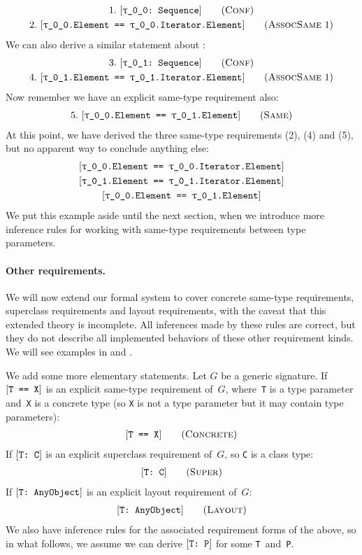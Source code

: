 \documentclass[../generics]{subfiles}
\begin{document}
\begin{example}
\begin{gather*}
\ConfStep{\rT}{Sequence}{1}\\
\AssocSameStep{1}{\rT.Element}{\rT.Iterator.Element}{2}
\end{gather*}
We can also derive a similar statement about \rU:
\begin{gather*}
\ConfStep{\rU}{Sequence}{3}\\
\AssocSameStep{1}{\rU.Element}{\rU.Iterator.Element}{4}
\end{gather*}
Now remember we have an explicit same-type requirement also:
\begin{gather*}
\SameStep{\rT.Element}{\rU.Element}{5}
\end{gather*}
At this point, we have derived the three same-type requirements (2), (4) and (5), but no apparent way to conclude anything else:
\begin{gather*}
\SameReq{\rT.Element}{\rT.Iterator.Element}\\
\SameReq{\rU.Element}{\rU.Iterator.Element}\\
\SameReq{\rT.Element}{\rU.Element}
\end{gather*}
We put this example aside until the next section, when we introduce more inference rules for working with same-type requirements between type parameters.
\end{example}

\paragraph{Other requirements.}
We will now extend our formal system to cover concrete same-type requirements, superclass requirements and layout requirements, with the caveat that this extended theory is incomplete. All inferences made by these rules are correct, but they do not describe all implemented behaviors of these other requirement kinds. We will see examples in  and .

We add some more elementary statements. Let $G$ be a generic signature. If $[\texttt{T == X}]$ is an explicit same-type requirement of~$G$, where~\texttt{T} is a type parameter and~\texttt{X} is a concrete type (so \texttt{X} is not a type parameter but it may contain type parameters):
\begin{gather*}
\ConcreteStepDef
\end{gather*}
If $[\texttt{T:~C}]$ is an explicit superclass requirement of~$G$, so \texttt{C} is a class type:
\begin{gather*}
\SuperStepDef
\end{gather*}
If $[\texttt{T:~AnyObject}]$ is an explicit layout requirement of~$G$:
\begin{gather*}
\LayoutStepDef
\end{gather*}
We also have inference rules for the associated requirement forms of the above, so in what follows, we assume we can derive $[\texttt{T:~P}]$ for some \texttt{T}~and~\texttt{P}.
\end{document}
